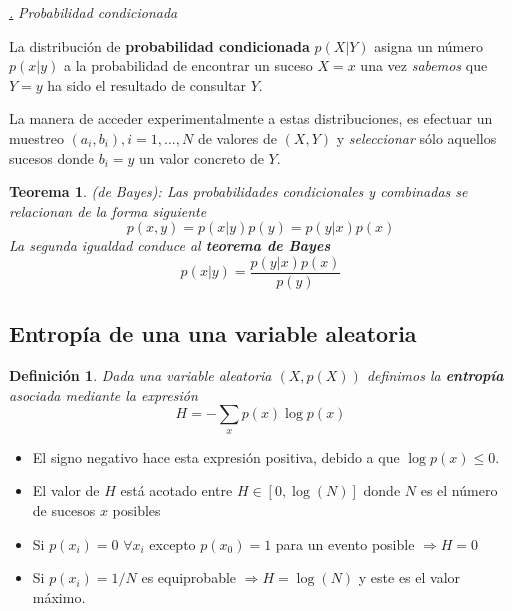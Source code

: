 \documentclass[a4paper,11pt]{book} %
\newtheorem{teorema_contador}{Teorema}
\newcommand{\Teorema}[1]{
		\begin{mybox_gray2}{}
			\begin{teorema_contador}
				 #1 
			\end{teorema_contador} 
		\end{mybox_gray2}
	}
\newtheorem{definicion_contador}{Definición}
\newcommand{\Definicion}[1]{
		\begin{mybox_gray2}{}
			\begin{definicion_contador}
				 #1 
			\end{definicion_contador} 
		\end{mybox_gray2}
	}
\numberwithin{equation}{chapter}
\def\subsubiContadorIt{\par\addtocounter{subsubsection}{1}\underline{\it\thesubsubsection.}\hskip0.5cm \setcounter{subsubsubsectionIt}{0}}
\newcommand{\SubsubiIt}[1]{
		\subsubiContadorIt \textit{#1}
	}
\newcounter{subsubsubsectionIt}[subsubsection]
\begin{document}
			\SubsubiIt{Probabilidad condicionada}

\begin{mybox_gray2}{}
La distribución de \textbf{probabilidad condicionada} $p(X|Y)$ asigna un número $p(x|y)$ a la probabilidad  de encontrar un suceso $X=x$ una vez \textit{sabemos} que $Y=y$ ha sido el resultado de consultar $Y$. 
\end{mybox_gray2}

La manera de acceder experimentalmente a estas distribuciones, es efectuar un muestreo $(a_i,b_i), i=1,...,N$ de valores de $(X,Y)$ y \textit{seleccionar} sólo aquellos sucesos donde $b_i = y$ un valor concreto de $Y$.

\Teorema{ (\textit{de Bayes}): 
Las probabilidades condicionales y combinadas se relacionan de la forma siguiente
	\begin{equation}
	p(x,y) = p(x|y)p(y) = p(y|x) p(x)
	\end{equation}
La segunda igualdad conduce al \textbf{teorema de Bayes}
	\begin{equation}
	p(x|y) = \frac{p(y|x)p(x)}{p(y)}
	\end{equation}
}

		\subsection{Entropía de una una variable aleatoria}

	\Definicion{
	Dada una variable aleatoria $(X,p(X))$ definimos la \textbf{entropía} asociada mediante la expresión
     	\begin{equation}
     	H = -\sum_x p(x)\log p(x)
     	\end{equation}
	}

\begin{itemize}
	\item El signo negativo hace esta expresión positiva, debido a que $\log p(x)\leq 0$.
	
	\item El valor de $H$ está acotado entre $H\in [0,\log(N)]$ donde $N$ es el número de sucesos $x$ posibles
	
	\item Si $p(x_i)=0 \,\,  \forall x_i$ excepto $p(x_0)=1$ para un evento posible $\Rightarrow H=0$
	
	\item Si $p(x_i) = 1/N$ es equiprobable $\Rightarrow H = \log(N)$ y este es el valor máximo. 
	
\end{itemize}
\end{document}
